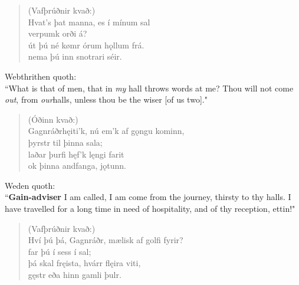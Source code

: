 \begin{verse}
(Vafþrúðnir kvað:) \\%
\bva Hvat's þat manna, \hld es í mínum sal \\%
\ind verpumk orði á? \\%
út þú né kømr \hld órum hǫllum frá. \\%
\ind nema þú inn snotrari séir.\\%
\end{verse}

\bvb Webthrithen quoth: \\ “What is that of men\footnotemark[10], that in \emph{my} hall throws words at me? Thou will not come \emph{out}, from \emph{our}\footnotemark[11] halls, unless thou be the wiser [of us two]." \\

\begin{verse}
(Óðinn kvað:) \\%
\bva Gagnráðr\footnotemark[5] hęiti'k, \hld nú em'k af gǫngu kominn, \\%
\ind þyrstr til þinna sala; \\%
laðar þurfi \hld hęf'k lęngi farit \\%
\ind ok þinna andfanga, jǫtunn.\\%
\end{verse}

\bvb Weden quoth: \\ “\textbf{Gain-adviser} I am called, I am come from the journey, thirsty to thy halls. I have travelled for a long time in need of hospitality, and of thy reception, ettin!" \\

\begin{verse}
(Vafþrúðnir kvað:) \\%
\bva Hví þú þá, Gagnráðr, \hld mælisk af golfi fyrir? \\%
\ind far þú í sess í sal; \\%
þá skal fręista, \hld hvárr flęira viti, \\%
\ind gęstr eða hinn gamli þulr.\\%
\end{verse}

